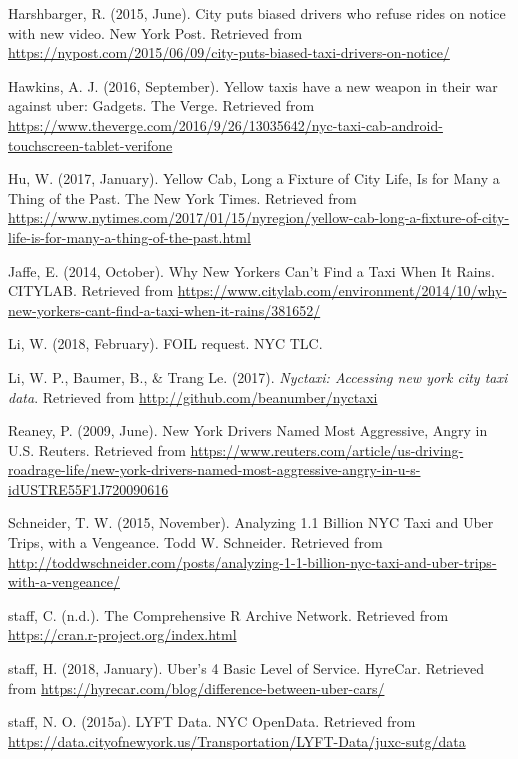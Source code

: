 \documentclass[12pt,twoside]{reedthesis}
\theoremstyle{definition}
\theoremstyle{definition}
\theoremstyle{definition}
\theoremstyle{remark}
\begin{document}
\hypertarget{ref-Rebecca2015}{}
Harshbarger, R. (2015, June). City puts biased drivers who refuse rides
on notice with new video. New York Post. Retrieved from
\url{https://nypost.com/2015/06/09/city-puts-biased-taxi-drivers-on-notice/}

\hypertarget{ref-andrew2016}{}
Hawkins, A. J. (2016, September). Yellow taxis have a new weapon in
their war against uber: Gadgets. The Verge. Retrieved from
\url{https://www.theverge.com/2016/9/26/13035642/nyc-taxi-cab-android-touchscreen-tablet-verifone}

\hypertarget{ref-hu2017}{}
Hu, W. (2017, January). Yellow Cab, Long a Fixture of City Life, Is for
Many a Thing of the Past. The New York Times. Retrieved from
\url{https://www.nytimes.com/2017/01/15/nyregion/yellow-cab-long-a-fixture-of-city-life-is-for-many-a-thing-of-the-past.html}

\hypertarget{ref-citylab}{}
Jaffe, E. (2014, October). Why New Yorkers Can't Find a Taxi When It
Rains. CITYLAB. Retrieved from
\url{https://www.citylab.com/environment/2014/10/why-new-yorkers-cant-find-a-taxi-when-it-rains/381652/}

\hypertarget{ref-foirequest}{}
Li, W. (2018, February). FOIL request. NYC TLC.

\hypertarget{ref-pkgnyctaxi}{}
Li, W. P., Baumer, B., \& Trang Le. (2017). \emph{Nyctaxi: Accessing new
york city taxi data}. Retrieved from
\url{http://github.com/beanumber/nyctaxi}

\hypertarget{ref-reaney2009}{}
Reaney, P. (2009, June). New York Drivers Named Most Aggressive, Angry
in U.S. Reuters. Retrieved from
\url{https://www.reuters.com/article/us-driving-roadrage-life/new-york-drivers-named-most-aggressive-angry-in-u-s-idUSTRE55F1J720090616}

\hypertarget{ref-schneider2015}{}
Schneider, T. W. (2015, November). Analyzing 1.1 Billion NYC Taxi and
Uber Trips, with a Vengeance. Todd W. Schneider. Retrieved from
\url{http://toddwschneider.com/posts/analyzing-1-1-billion-nyc-taxi-and-uber-trips-with-a-vengeance/}

\hypertarget{ref-cran}{}
staff, C. (n.d.). The Comprehensive R Archive Network. Retrieved from
\url{https://cran.r-project.org/index.html}

\hypertarget{ref-uberx}{}
staff, H. (2018, January). Uber's 4 Basic Level of Service. HyreCar.
Retrieved from
\url{https://hyrecar.com/blog/difference-between-uber-cars/}

\hypertarget{ref-datalyft}{}
staff, N. O. (2015a). LYFT Data. NYC OpenData. Retrieved from
\url{https://data.cityofnewyork.us/Transportation/LYFT-Data/juxc-sutg/data}
\end{document}
